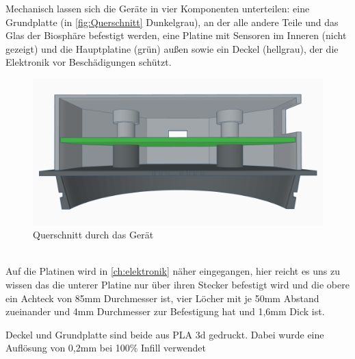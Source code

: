\documentclass[12pt, a4paper, oneside]{report}
\begin{document}
Mechanisch lassen sich die Geräte in vier Komponenten unterteilen:
eine Grundplatte (in \autoref{fig:Querschnitt} Dunkelgrau), an der alle andere Teile und das Glas der Biosphäre befestigt werden, eine Platine mit Sensoren im Inneren (nicht gezeigt) und die Hauptplatine (grün) außen sowie ein Deckel (hellgrau), der die Elektronik vor Beschädigungen schützt.
\begin{figure}[h]
	\centering
	\includegraphics[width=1\textwidth]{pic/Querschnitt}
	\caption{Querschnitt durch das Gerät}
	\label{fig:Querschnitt}
\end{figure}
\\Auf die Platinen wird in \autoref{ch:elektronik} näher eingegangen, hier reicht es uns zu wissen das die unterer Platine nur über ihren Stecker befestigt wird und die obere ein Achteck von 85mm Durchmesser ist, vier Löcher mit je 50mm Abstand zueinander und 4mm Durchmesser zur Befestigung hat und 1,6mm Dick ist.

Deckel und Grundplatte sind beide aus PLA 3d gedruckt. Dabei wurde eine Auflösung von 0,2mm bei 100\% Infill verwendet
\end{document}
